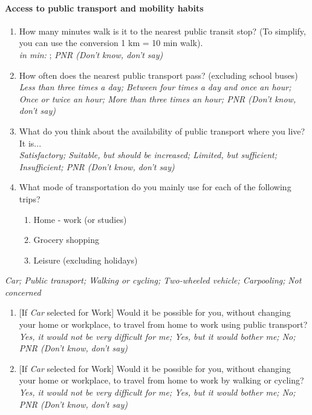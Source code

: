 \documentclass[english,5p,authoryear]{elsarticle}
\begin{document}
\begin{appendices}
\paragraph{Access to public transport and mobility habits}
\begin{enumerate}[resume,leftmargin=*]
\item How many minutes walk is it to the nearest public transit stop? (To
simplify, you can use the conversion 1 km = 10 min walk). \emph{}\\
\emph{in min:} ; \emph{PNR (Don't know, don't say) }
\item How often does the nearest public transport pass? (excluding school
buses) \emph{}\\
\emph{Less than three times a day; Between four times a day and once
an hour; Once or twice an hour; More than three times an hour; PNR
(Don't know, don't say) }
\item What do you think about the availability of public transport where
you live? It is... \emph{}\\
\emph{Satisfactory; Suitable, but should be increased; Limited, but
sufficient; Insufficient; PNR (Don't know, don't say) }
\item What mode of transportation do you mainly use for each of the following
trips?
\begin{enumerate}[resume,leftmargin=*]
\item Home - work (or studies) 
\item Grocery shopping 
\item Leisure (excluding holidays) 
\end{enumerate}
\end{enumerate}
\emph{Car; Public transport; Walking or cycling; Two-wheeled vehicle;
Carpooling;} \emph{Not concerned} 
\begin{enumerate}[resume,leftmargin=*]
\item {[}If \emph{Car }selected for Work{]} Would it be possible for you,
without changing your home or workplace, to travel from home to work
using public transport? \emph{}\\
\emph{Yes, it would not be very difficult for me; Yes, but it would
bother me; No; PNR (Don't know, don't say) }
\item {[}If \emph{Car }selected for Work{]} Would it be possible for you,
without changing your home or workplace, to travel from home to work
by walking or cycling? \emph{}\\
\emph{Yes, it would not be very difficult for me; Yes, but it would
bother me; No; PNR (Don't know, don't say) }
\end{enumerate}


\end{appendices}
\end{document}
